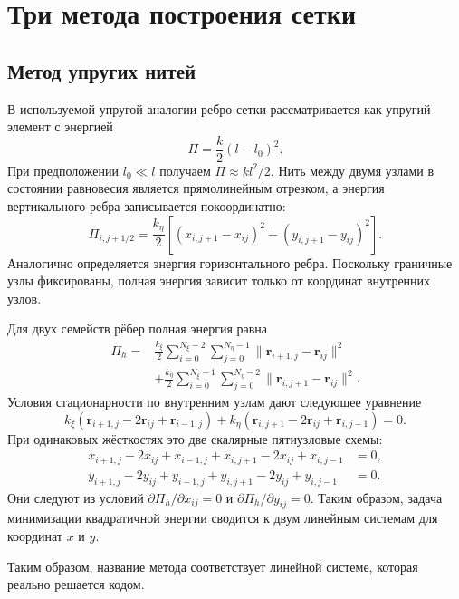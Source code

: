 \documentclass[11pt,a4paper]{article}
\newcommand{\vect}[1]{\boldsymbol{#1}}
\begin{document}
\section{Три метода построения сетки}

\subsection{Метод упругих нитей}

В используемой упругой аналогии ребро сетки рассматривается как упругий
элемент с энергией
\[
 \Pi=\frac{k}{2}(l-l_0)^2.
\]
При предположении \(l_0\ll l\) получаем \(\Pi\approx kl^2/2\).
Нить между двумя узлами в состоянии равновесия является прямолинейным
отрезком, а энергия вертикального ребра записывается покоординатно:
\begin{equation}
\Pi_{i,j+1/2}
=\frac{k_\eta}{2}
\left[(x_{i,j+1}-x_{ij})^2+(y_{i,j+1}-y_{ij})^2\right].
\label{eq:single-spring}
\end{equation}
Аналогично определяется энергия горизонтального ребра. Поскольку
граничные узлы фиксированы, полная энергия зависит только от координат
внутренних узлов.

Для двух семейств рёбер полная энергия равна
\begin{align}
\Pi_h={}&\frac{k_\xi}{2}
 \sum_{i=0}^{N_\xi-2}\sum_{j=0}^{N_\eta-1}
 \lVert\vect r_{i+1,j}-\vect r_{ij}\rVert^2
\nonumber\\
&+\frac{k_\eta}{2}
 \sum_{i=0}^{N_\xi-1}\sum_{j=0}^{N_\eta-2}
 \lVert\vect r_{i,j+1}-\vect r_{ij}\rVert^2 .
\label{eq:spring-energy}
\end{align}
Условия стационарности по внутренним узлам дают следующее уравнение
\begin{equation}
k_\xi(\vect r_{i+1,j}-2\vect r_{ij}+\vect r_{i-1,j})
+k_\eta(\vect r_{i,j+1}-2\vect r_{ij}+\vect r_{i,j-1})=0.
\label{eq:spring-equilibrium}
\end{equation}
При одинаковых жёсткостях это две скалярные пятиузловые схемы:
\begin{align}
x_{i+1,j}-2x_{ij}+x_{i-1,j}
+x_{i,j+1}-2x_{ij}+x_{i,j-1}&=0,\\
y_{i+1,j}-2y_{ij}+y_{i-1,j}
+y_{i,j+1}-2y_{ij}+y_{i,j-1}&=0.
\end{align}
Они следуют из условий
\(\partial\Pi_h/\partial x_{ij}=0\) и
\(\partial\Pi_h/\partial y_{ij}=0\). Таким образом, задача минимизации
квадратичной энергии сводится к двум линейным системам для координат
\(x\) и \(y\).

Таким образом, название метода соответствует линейной системе, которая
реально решается кодом.
\end{document}
